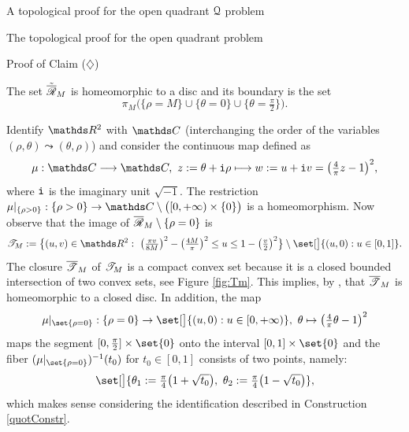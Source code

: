 \documentclass[11pt, a4paper, english, twoside, notitlepage, openright]{report}
\begin{document}
\begin{chapter}{A topological proof for the open quadrant $\mathcal{Q}$ problem}
\begin{section}{The topological proof for the open quadrant problem}
\begin{subsection}{Proof of Claim ($\diamondsuit$)}

\begin{lemma}\label{RMdisc}
The set $\tilde{\overline{\mathscr{R}}}_M$ is homeomorphic to a disc and its boundary is the set
$$
\pi_M\big(\{\rho=M\}\cup\{\theta=0\}\cup\{\theta=\tfrac{\pi}{2}\}\big).
$$
\begin{Proof} Identify $\R^2$ with $\C$ (interchanging the order of the variables $(\rho,\theta)\leadsto(\theta,\rho)$) and consider the continuous map defined as 
$$
\mu:\C\longrightarrow\C,\ z:=\theta+{\tt i}\rho\longmapsto w:=u+{\tt i}v=\big(\tfrac{4}{\pi}z-1\big)^2,
$$
where ${\tt i}$ is the imaginary unit $\sqrt{-1}$. The restriction $\mu|_{\{\rho>0\}}:\{\rho>0\}\to\C\setminus\big([0,+\infty)\times\{0\}\big)$ is a homeomorphism. Now observe that the image of $\overline{\mathscr{R}}_M\setminus\{\rho=0\}$ is
$$
\Tt_M:=\big\{(u,v)\in\R^2:\ \big(\tfrac{\pi v}{8M}\big)^2-\big(\tfrac{4M}{\pi}\big)^2\leq u\leq1-\big(\tfrac{v}{2}\big)^2\big\}\setminus\set[\big]{(u,0):u\in[0,1]}.
$$
The closure $\overline{\mathscr{T}}_M$ of $\mathscr{T}_M$ is a compact convex set because it is a closed bounded intersection of two convex sets, see Figure \ref{fig:Tm}. This implies, by \cite[Corolary 11.3.4]{b}, that $\overline{\mathscr{T}}_M$ is homeomorphic to a closed disc. In addition, the map
$$
\mu|_{\set{\rho=0}}:\{\rho=0\}\to\set[\big]{(u,0):u\in[0,+\infty)},\ \theta\mapsto\big(\tfrac{4}{\pi}\theta-1\big)^2
$$
maps the segment $[0,\tfrac{\pi}{2}]\times\set{0}$ onto the interval $[0,1]\times\set{0}$ and the fiber $(\mu|_{\set{\rho=0}})^{-1}(t_0)$ for $t_0\in[0,1]$ consists of two points, namely: 
$$
\set[\big]{\theta_1:=\tfrac{\pi}{4}\big(1+\sqrt{t_0}\big),\, \, \theta_2:=\tfrac{\pi}{4}\big(1-\sqrt{t_0}\big)},
$$
which makes sense considering the identification described in Construction \ref{quotConstr}.


\end{Proof}
\end{lemma}
\end{subsection}
\end{section}
\end{chapter}
\end{document}
